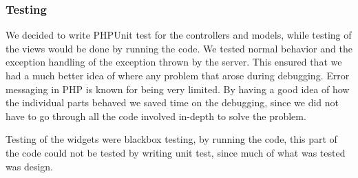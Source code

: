 \subsubsection{Testing}
We decided to write PHPUnit test for the controllers and models, while testing of the views would be done by running the code. We tested normal behavior and the exception handling of the exception thrown by the server. This ensured that we had a much better idea of where any problem that arose during debugging. Error messaging in PHP is known for being very limited. By having a good idea of how the individual parts behaved we saved time on the debugging, since we did not have to go through all the code involved in-depth to solve the problem. 

Testing of the widgets were blackbox testing, by running the code, this part of the code could not be tested by writing unit test, since much of what was tested was design.